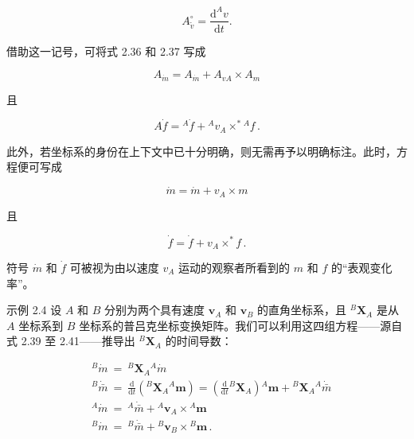 \documentclass[10pt,a4paper]{book}
\theoremstyle{thmstyle} %
\theoremstyle{defstyle} %
\theoremstyle{prostyle} %
\begin{document}
$$
A _ { \tilde { v } } ^{\circ} = \frac { \mathrm { d } ^{A} v } { \mathrm { d } t } .
$$



借助这一记号，可将式 2.36 和 2.37 写成



$$
A _ { \dot { m } } = A _ { \dot { m } } + A _ { v A } \times A _ { m }
$$



且



$$
A \dot { f } = { } ^{A} \dot { f } + { } ^{A} v _ { A } \times ^{*} { } ^{A} f \, .
$$



此外，若坐标系的身份在上下文中已十分明确，则无需再予以明确标注。此时，方程便可写成



$$
\dot { m } = \dot { m } + v _ { A } \times m
$$



且



$$
\dot { f } = \dot { f } + v _ { A } \times ^{*} f \, .
$$



符号 $\dot{m}$ 和 $\dot{f}$ 可被视为由以速度 $v_A$ 运动的观察者所看到的 $m$ 和 $f$ 的“表观变化率”。



示例 2.4 设 $A$ 和 $B$ 分别为两个具有速度 $\boldsymbol{v}_{A}$ 和 $\boldsymbol{v}_{B}$ 的直角坐标系，且 ${}^{B}\boldsymbol{X}_{A}$ 是从 $A$ 坐标系到 $B$ 坐标系的普吕克坐标变换矩阵。我们可以利用这四组方程——源自式 2.39 至 2.41——推导出 ${}^{B}\boldsymbol{X}_{A}$ 的时间导数：



$$
\begin{array}{rl} & { { } ^{B} \dot { m } \ = \ { } ^{B} \mathbf { X } _ { A } { } ^{A} \dot { m } } \\& { { } ^{B} \dot { \bar { m } } \ = \ \frac { \mathrm { d } } { \mathrm { d } t } \left( { } ^{B} \mathbf { X } _ { A } { } ^{A} \boldsymbol { m } \right) = \left( \frac { \mathrm { d } } { \mathrm { d } t } { } ^{B} \mathbf { X } _ { A } \right) { } ^{A} \boldsymbol { m } + { } ^{B} \mathbf { X } _ { A } { } ^{A} \dot { \bar { m } } } \\& { { } ^{A} \dot { m } \ = \ { } ^{A} \dot { \bar { m } } + { } ^{A} \boldsymbol { v } _ { A } \times { } ^{A} \boldsymbol { m } } \\& { { } ^{B} \dot { m } \ = \ { } ^{B} \dot { \bar { m } } + { } ^{B} \boldsymbol { v } _ { B } \times { } ^{B} \boldsymbol { m } \, . } \end{array}
$$
\end{document}
